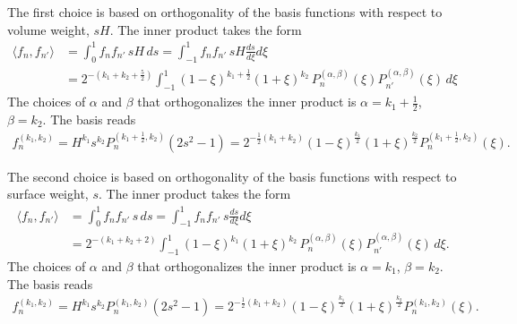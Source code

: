 The first choice is based on orthogonality of the basis functions with respect to volume weight, $sH$. The inner product takes the form
%
\[\begin{aligned}
    \langle f_n, f_{n'} \rangle &= \int_{0}^1 f_n f_{n'} \, sH \, ds = \int_{-1}^1 f_n f_{n'} \, sH \frac{ds}{d\xi} d\xi \\ 
    &= 2^{-\left(k_1 + k_2 + \frac{5}{2}\right)} \int_{-1}^{1} (1 - \xi)^{k_1 + \frac{1}{2}} (1 + \xi)^{k_2} \, P_n^{(\alpha, \beta)}(\xi) P_{n'}^{(\alpha, \beta)}(\xi) \, d\xi
\end{aligned}\]
%
The choices of $\alpha$ and $\beta$ that orthogonalizes the inner product is $\alpha = k_1 + \frac{1}{2}$, $\beta = k_2$. The basis reads
%
\begin{equation}
\begin{aligned}
    f_n^{(k_1, k_2)} = H^{k_1} s^{k_2} P_n^{(k_1 + \frac{1}{2}, k_2)}(2s^2 - 1) = 2^{-\frac{1}{2}(k_1 + k_2)} (1 - \xi)^{\frac{k_1}{2}} (1 + \xi)^{\frac{k_2}{2}} P_n^{(k_1 + \frac{1}{2}, k_2)}(\xi).
\end{aligned}
\end{equation}
%

The second choice is based on orthogonality of the basis functions with respect to surface weight, $s$. The inner product takes the form
%
\[\begin{aligned}
    \langle f_n, f_{n'} \rangle &= \int_{0}^1 f_n f_{n'} \, s \, ds = \int_{-1}^1 f_n f_{n'} \, s \frac{ds}{d\xi} d\xi \\ 
    &= 2^{-\left(k_1 + k_2 + 2\right)} \int_{-1}^{1} (1 - \xi)^{k_1} (1 + \xi)^{k_2} \, P_n^{(\alpha, \beta)}(\xi) P_{n'}^{(\alpha, \beta)}(\xi) \, d\xi.
\end{aligned}\]
%
The choices of $\alpha$ and $\beta$ that orthogonalizes the inner product is $\alpha = k_1$, $\beta = k_2$. The basis reads
%
\begin{equation}
\begin{aligned}
    f_n^{(k_1, k_2)} = H^{k_1} s^{k_2} P_n^{(k_1, k_2)}(2s^2 - 1) = 2^{-\frac{1}{2}(k_1 + k_2)} (1 - \xi)^{\frac{k_1}{2}} (1 + \xi)^{\frac{k_2}{2}} P_n^{(k_1, k_2)}(\xi).
\end{aligned}
\end{equation}
%

